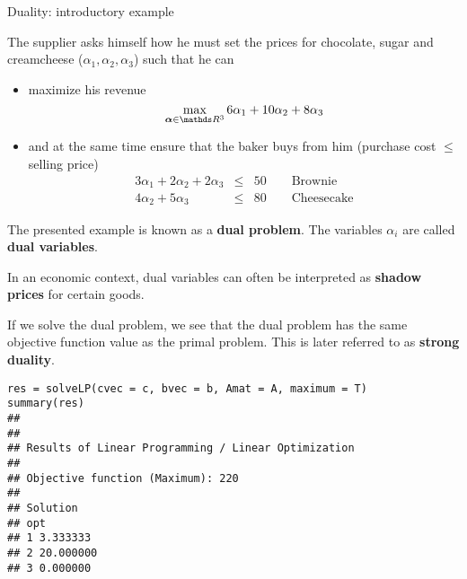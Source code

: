 \begin{vbframe}{Duality: introductory example}
\lz

The supplier asks himself how he must set the prices for chocolate, sugar and creamcheese ($\alpha_1, \alpha_2, \alpha_3$) such that he can

\begin{itemize}
\item maximize his revenue
$$
\max_{\bm{\alpha} \in \R^3}6 \alpha_1 + 10 \alpha_2 + 8 \alpha_3
$$
\item and at the same time ensure that the baker buys from him (purchase cost $\le$ selling price)
\begin{eqnarray*}
3\alpha_1 + 2\alpha_2 + 2\alpha_3 &\le& 50 \qquad \text{Brownie} \\
4\alpha_2 + 5\alpha_3 &\le& 80 \qquad \text{Cheesecake}
\end{eqnarray*}

\end{itemize}

\framebreak

The presented example is known as a \textbf{dual problem}. The variables $\alpha_i$ are called \textbf{dual variables}.

\lz

In an economic context, dual variables can often be interpreted as \textbf{shadow prices} for certain goods.

\lz

If we solve the dual problem, we see that the dual problem has the same objective function value as the primal problem. This is later referred to as \textbf{strong duality}.

%
\framebreak
\footnotesize
\begin{verbatim}
res = solveLP(cvec = c, bvec = b, Amat = A, maximum = T)
summary(res)
##
##
## Results of Linear Programming / Linear Optimization
##
## Objective function (Maximum): 220
##
## Solution
## opt
## 1 3.333333
## 2 20.000000
## 3 0.000000
\end{verbatim}





\end{vbframe}
